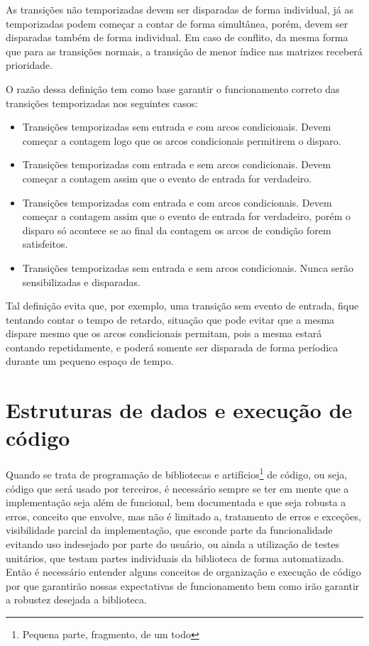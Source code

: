 As transições não temporizadas devem ser disparadas de forma individual, já as temporizadas podem começar a contar de forma simultânea, porém, devem ser disparadas também de forma individual. Em caso de conflito, da mesma forma que para as transições normais, a transição de menor índice nas matrizes receberá prioridade. 

O razão dessa definição tem como base garantir o funcionamento correto das transições temporizadas nos seguintes casos:

\begin{itemize}
	\item Transições temporizadas sem entrada e com arcos condicionais. Devem começar a contagem logo que os arcos condicionais permitirem o disparo. 
	\item Transições temporizadas com entrada e sem arcos condicionais. Devem começar a contagem assim que o evento de entrada for verdadeiro. 
	\item Transições temporizadas com entrada e com arcos condicionais. Devem começar a contagem assim que o evento de entrada for verdadeiro, porém o disparo só acontece se ao final da contagem os arcos de condição forem satisfeitos. 
	\item Transições temporizadas sem entrada e sem arcos condicionais. Nunca serão sensibilizadas e disparadas. 
\end{itemize}

Tal definição evita que, por exemplo, uma transição sem evento de entrada, fique tentando contar o tempo de retardo, situação que pode evitar que a mesma dispare mesmo que os arcos condicionais permitam, pois a mesma estará contando repetidamente, e poderá somente ser disparada de forma períodica durante um pequeno espaço de tempo.

\section{Estruturas de dados e execução de código}

Quando se trata de programação de bibliotecas e artifícios\footnote{Pequena parte, fragmento, de um todo} de código, ou seja, código que será usado por terceiros, é necessário sempre se ter em mente que a implementação seja além de funcional, bem documentada e que seja robusta a erros, conceito que envolve, mas não é limitado a, tratamento de erros e exceções, visibilidade parcial da implementação, que esconde parte da funcionalidade evitando uso indesejado por parte do usuário, ou ainda a utilização de testes unitários, que testam partes individuais da biblioteca de forma automatizada. Então é necessário entender alguns conceitos de organização e execução de código por que garantirão nossas expectativas de funcionamento bem como irão garantir a robustez desejada a biblioteca. 

